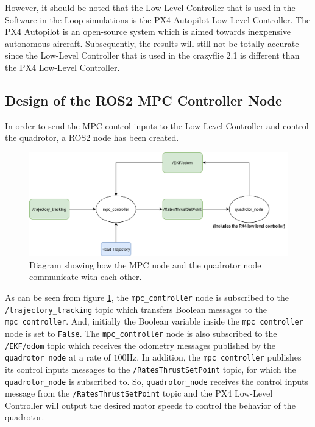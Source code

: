 \documentclass{thesisreport}
\begin{document}
However, it should be noted that the Low-Level Controller that is used in the Software-in-the-Loop simulations is the PX4 Autopilot Low-Level Controller. The PX4 Autopilot \cite{px4_autopilot_2021} is an open-source system which is aimed towards inexpensive autonomous aircraft. Subsequently, the results will still not be totally accurate since the Low-Level Controller that is used in the crazyflie 2.1 is different than the PX4 Low-Level Controller.

\subsection{Design of the ROS2 MPC Controller Node}
 
 In order to send the MPC control inputs to the Low-Level Controller and control the quadrotor, a ROS2 node has been created.
 
 \begin{figure}[h]
 	\centering
 	\includegraphics[width=\textwidth]{Images/sil_simulations/ros2_node_diagram.png}
 	\caption{Diagram showing how the MPC node and the quadrotor node communicate with each other.}
 	\label{fig:ROS2_MPC_node}
 \end{figure}

As can be seen from figure \ref{fig:ROS2_MPC_node}, the \texttt{mpc\_controller} node is subscribed to the \texttt{/trajectory\_tracking} topic which transfers Boolean messages to the \texttt{mpc\_controller}. And, initially the Boolean variable inside the \texttt{mpc\_controller} node is set to \texttt{False}. The \texttt{mpc\_controller} node is also subscribed to the \texttt{/EKF/odom} topic which receives the odometry messages published by the \texttt{quadrotor\_node} at a rate of $100$Hz. In addition, the \texttt{mpc\_controller} publishes its control inputs messages to the \texttt{/RatesThrustSetPoint} topic, for which the \texttt{quadrotor\_node} is subscribed to. So, \texttt{quadrotor\_node} receives the control inputs message from the \texttt{/RatesThrustSetPoint} topic and the PX4 Low-Level Controller will output the desired motor speeds to control the behavior of the quadrotor. \\
\end{document}
